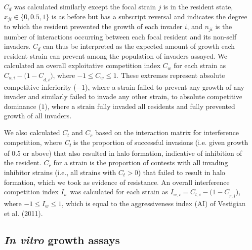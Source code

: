 \documentclass[%
preprint,
superscriptaddress,
 amsmath,amssymb,
 aps,
]{revtex4-1}
\begin{document}
$C_d$ was calculated similarly except the focal strain $j$ is in the resident state, $x_{ji} \in \{ 0,0.5,1\}$ is as before but has a subscript
reversal and indicates the degree to which the resident prevented the
growth of each invader $i$, and $n_{ji}$ is the number of interactions occurring between each focal resident and its non-self invaders. $C_d$ can thus be interpreted as the expected amount of growth each resident strain can prevent among the population of invaders assayed. We calculated an overall exploitative competition index $C_w$ for each strain as $C_{o,i} - {(1 - C}_{d,i})$, where $-1 \leq C_{w} \leq 1$. These extremes represent absolute
competitive inferiority ($-1$), where a strain failed to prevent any
growth of any invader and similarly failed to invade any other strain,
to absolute competitive dominance ($1$), where a strain fully invaded all
residents and fully prevented growth of all invaders.

We also calculated $C_t$ and $C_r$ based on the interaction matrix for interference competition, where \emph{C\textsubscript{t}} is the proportion of successful invasions (i.e. given growth of 0.5 or above) that also resulted in halo formation, indicative of inhibition of the resident. $C_r$ for a strain is the proportion of contests with all invading inhibitor strains (i.e., all strains with $C_t > 0$) that failed to result in halo formation, which we took as evidence of resistance. An overall interference competition index $I_w$ was calculated for each strain as $I_{w,i} = C_{t,i} - {(1 - C}_{r,i})$, where $-1 \leq I_w \leq 1$, which is equal to the aggressiveness index (AI) of Vestigian et al. (2011).

\subsection*{\emph{In vitro} growth assays}
\end{document}
